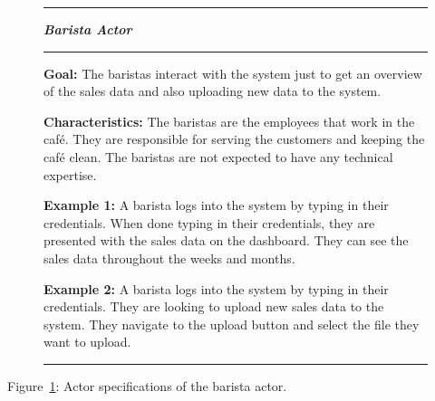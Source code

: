 \begin{figure}[H]
    \noindent
    \rule{\textwidth}{0.4pt}
    \begin{center}
    \noindent
    \textit{\textbf{Barista Actor}}
    \end{center}

    \noindent
    \rule{\textwidth}{0.4pt}

    \noindent
    \textbf{Goal:} The baristas interact with the system just to get an overview of the sales data and also uploading
    new data to the system.
    \newline

    \noindent
    \textbf{Characteristics:} The baristas are the employees that work in the café.
    They are responsible for serving the customers and keeping the café clean.
    The baristas are not expected to have any technical expertise.
    \newline

    \noindent
    \textbf{Example 1:} A barista logs into the system by typing in their credentials.
    When done typing in their credentials, they are presented with the sales data on the dashboard.
    They can see the sales data throughout the weeks and months.
    \newline

    \noindent
    \textbf{Example 2:} A barista logs into the system by typing in their credentials.
    They are looking to upload new sales data to the system.
    They navigate to the upload button and select the file they want to upload.

    \noindent
    \rule{\textwidth}{0.04pt}\label{fig:actor-barista}
\end{figure}

Figure~\ref{fig:actor-barista}: Actor specifications of the barista actor.
\newline

